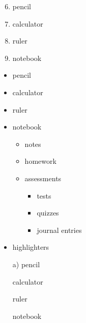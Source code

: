\documentclass[11pt]{article}
\begin{document}
\begin{enumerate} \setcounter{enumi}{5} %
    \item pencil
    \item calculator
    \item ruler
    \item notebook
\end{enumerate}

\vspace{1cm}

\begin{itemize}
    \item pencil
    \item calculator
    \item ruler
    \item notebook
    \begin{itemize}
        \item notes
        \item homework
        \item assessments
            \begin{itemize}
                \item tests
                \item quizzes
                \item journal entries
            \end{itemize}
    \end{itemize}
    \item highlighters
\end{itemize}

\vspace{1cm}

\begin{enumerate} %
    \item[a)] pencil %
    \item[] calculator
    \item[] ruler
    \item[] notebook
\end{enumerate}
\end{document}
